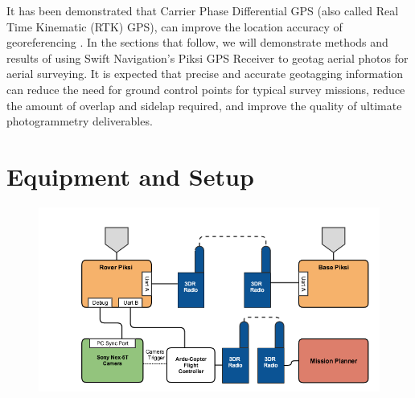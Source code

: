 \documentclass{article}
\begin{document}
It has been demonstrated that Carrier Phase Differential GPS (also called Real Time Kinematic (RTK) GPS), can improve the location accuracy of georeferencing \cite{sensefly2}.  In the sections that follow, we will demonstrate methods and results of using Swift Navigation's Piksi GPS Receiver to geotag aerial photos for aerial surveying.  It is expected that precise and accurate geotagging information can reduce the need for ground control points for typical survey missions, reduce the amount of overlap and sidelap required, and improve the quality of ultimate photogrammetry deliverables.

\section{Equipment and Setup}
\label{sec:equipment}
\begin{figure}[h]
\includegraphics[width=7in]{images/flow_charts/uav_piksi_flow_chart.png}
\end{figure}
\end{document}

